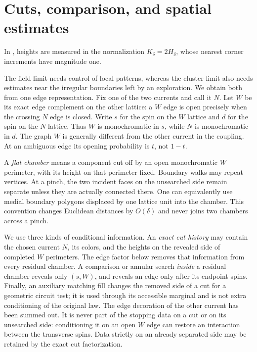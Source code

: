\section{Cuts, comparison, and spatial estimates}
\label{sec:spatial}

In , heights are measured in the
normalization $K_\delta=2H_\delta$, whose nearest corner increments have
magnitude one.

The field limit needs control of local patterns, whereas the cluster
limit also needs estimates near the irregular boundaries left by an
exploration. We obtain both from one edge representation. Fix one of the
two currents and call it $N$. Let $W$ be its exact edge complement on the
other lattice: a $W$ edge is open precisely when the crossing $N$ edge is
closed. Write $s$ for the spin on the $W$ lattice and $d$ for the spin on
the $N$ lattice. Thus $W$ is monochromatic in $s$, while $N$ is
monochromatic in $d$. The graph $W$ is generally different from the other
current in the coupling. At an ambiguous edge its opening probability is
$t$, not $1-t$.

A \emph{flat chamber} means a component cut off by an open monochromatic
$W$ perimeter, with its height on that perimeter fixed. Boundary walks
may repeat vertices. At a pinch, the two incident faces on the unsearched
side remain separate unless they are actually connected there. One can
equivalently use medial boundary polygons displaced by one lattice unit
into the chamber. This convention changes Euclidean distances by
$O(\delta)$ and never joins two chambers across a pinch.

We use three kinds of conditional information. An \emph{exact cut
history} may contain the chosen current $N$, its colors, and the heights
on the revealed side of completed $W$ perimeters. The edge factor below
removes that information from every residual chamber. A comparison or
annular search \emph{inside} a residual chamber reveals only $(s,W)$,
and reveals an edge only after its endpoint spins. Finally, an auxiliary
matching fill changes the removed side of a cut for a geometric circuit
test; it is used through its accessible marginal and is not extra
conditioning of the original law. The edge decoration of the other
current has been summed out. It is never part of the stopping data on a
cut or on its unsearched side: conditioning it on an open $W$ edge can
restore an interaction between the transverse spins. Data strictly on an
already separated side may be retained by the exact cut factorization.

